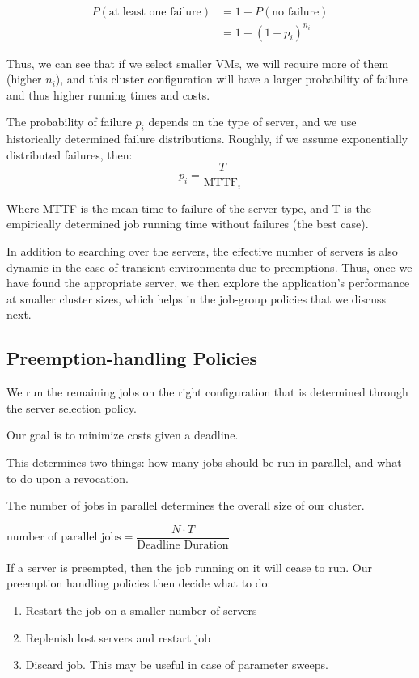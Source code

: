 \begin{align}
  \label{eq:pfail1}
  P(\text{at least one failure}) &= 1-P(\text{no failure}) \\
                                 &= 1-(1-p_i)^{n_i} 
\end{align}

Thus, we can see that if we select smaller VMs, we will require more of them (higher $n_i$), and this cluster configuration will have a larger probability of failure and thus higher running times and costs.

The probability of failure $p_i$ depends on the type of server, and we use historically determined failure distributions.
Roughly, if we assume exponentially distributed failures, then:
\begin{equation}
  \label{eq:pi}
  p_i = \dfrac{T}{\text{MTTF}_i}
\end{equation}

Where MTTF is the mean time to failure of the server type, and T is the empirically determined job running time without failures (the best case).






In addition to searching over the servers, the effective number of servers is also dynamic in the case of transient environments due to preemptions.
Thus, once we have found the appropriate server, we then explore the application's performance at smaller cluster sizes, which helps in the job-group policies that we discuss next. 


\subsection{Preemption-handling Policies}

We run the remaining jobs on the right configuration that is determined through the server selection policy.

Our goal is to minimize costs given a deadline.

This determines two things: how many jobs should be run in parallel, and what to do upon a revocation.

The number of jobs in parallel determines the overall size of our cluster.

$\text{number of parallel jobs} = \dfrac{N\cdot T}{\text{Deadline Duration}}$

If a server is preempted, then the job running on it will cease to run.
Our preemption handling policies then decide what to do:
\begin{enumerate}
\item Restart the job on a smaller number of servers 
\item Replenish lost servers and restart job
\item Discard job. This may be useful in case of parameter sweeps. 
\end{enumerate}

